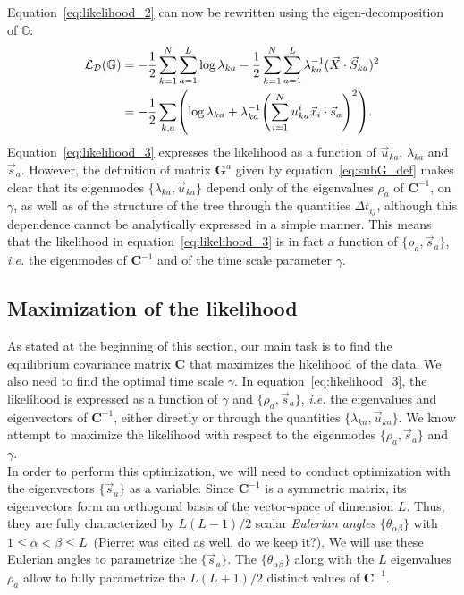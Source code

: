 \documentclass[preprint,amsmath,amssymb,superscriptaddress,showpacs,pre]{revtex4-1}
\let\originalleft\left
\let\originalright\right
\renewcommand{\left}{\mathopen{}\mathclose\bgroup\originalleft}
\renewcommand{\right}{\aftergroup\egroup\originalright}
\def\vx{\vec x}
\newcommand{\pierre}[1]{{\color{red}Pierre: #1}}
\newcommand{\iC}{\bm{C}^{-1}}
\newcommand{\vsa}{\vec{s}_a}
\newcommand{\vuka}{\vec{u}_{ka}}
\begin{document}
Equation~\ref{eq:likelihood_2} can now be rewritten using the eigen-decomposition of $\mathbb{G}$: 
\begin{equation}
	\begin{split}
		\mathcal{L}_{\mathcal{D}}(\mathbb{G}) &= -\frac 1 2 \sum_{k=1}^N\sum_{a=1}^L \log\lambda_{ka} - \frac 1 2 \sum_{k=1}^N\sum_{a=1}^L \lambda_{ka}^{-1}(\vec{X}\cdot \vec{S}_{ka})^2\\
		&= -\frac 1 2 \sum_{k,a} \left(\log\lambda_{ka} + \lambda_{ka}^{-1}	\left(\sum_{i=1}^N u_{ka}^i\vx_i\cdot\vsa\right)^2 \right).
	\end{split}
	\label{eq:likelihood_3}
\end{equation}
Equation~\ref{eq:likelihood_3} expresses the likelihood as a function of $\vuka$, $\lambda_{ka}$ and $\vsa$. 
However, the definition of matrix $\mathbf{G}^a$ given by equation~\ref{eq:subG_def} makes clear that its eigenmodes $\{\lambda_{ka}, \vuka \}$ depend only of the eigenvalues $\rho_a$ of $\iC$, on $\gamma$, as well as of the structure of the tree through the quantities $\Delta t_{ij}$, although this dependence cannot be analytically expressed in a simple manner. 
This means that the likelihood in equation~\ref{eq:likelihood_3} is in fact a function of $\{\rho_a, \vsa\}$, \emph{i.e.} the eigenmodes of $\iC$ and of the time scale parameter $\gamma$.




\subsection{Maximization of the likelihood} %
\label{sub:maximization_of_the_likelihood}

As stated at the beginning of this section, our main task is to find the equilibrium covariance matrix $\mathbf{C}$ that maximizes the likelihood of the data. 
We also need to find the optimal time scale $\gamma$. 
In equation~\ref{eq:likelihood_3}, the likelihood is expressed as a function of $\gamma$ and $\{\rho_a, \vsa\}$, \emph{i.e.} the eigenvalues and eigenvectors of $\iC$, either directly or through the quantities $\{\lambda_{ka}, \vuka \}$. 
We know attempt to maximize the likelihood with respect to the eigenmodes $\{\rho_a, \vsa\}$ and $\gamma$. \\
In order to perform this optimization, we will need to conduct optimization with the eigenvectors $\{\vsa\}$ as a variable. 
Since $\iC$ is a symmetric matrix, its eigenvectors form an orthogonal basis of the vector-space of dimension $L$. 
Thus, they are fully characterized by $L(L-1)/2$ scalar \emph{Eulerian angles} $\{\theta_{\alpha\beta}\}$ with $1\leq \alpha < \beta \leq L$~\cite{Raffenetti1970GEA}(\pierre{\cite{Shepard_param_OM} was cited as well, do we keep it?}). 
We will use these Eulerian angles to parametrize the $\{\vsa\}$. The $\{\theta_{\alpha\beta}\}$ along with the $L$ eigenvalues $\rho_a$ allow to fully parametrize the $L(L+1)/2$ distinct values of $\iC$. \\
\end{document}
